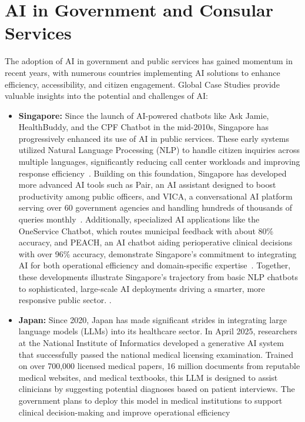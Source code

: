 \documentclass[12pt]{report}
\begin{document}
\section{AI in Government and Consular Services}

The adoption of AI in government and public services has gained momentum in recent years, with numerous countries implementing AI solutions to enhance efficiency, accessibility, and citizen engagement. 
Global Case Studies provide valuable insights into the potential and challenges of AI:
\begin{itemize}
    \item \textbf{Singapore:} Since the launch of AI-powered chatbots like Ask Jamie, HealthBuddy, and the CPF Chatbot in the mid-2010s, Singapore has progressively enhanced its use of AI in public services. These early systems utilized Natural Language Processing (NLP) to handle citizen inquiries across multiple languages, significantly reducing call center workloads and improving response efficiency~\cite{govtech2016askjamie}. Building on this foundation, Singapore has developed more advanced AI tools such as Pair, an AI assistant designed to boost productivity among public officers, and VICA, a conversational AI platform serving over 60 government agencies and handling hundreds of thousands of queries monthly~\cite{govtech2025pair}. Additionally, specialized AI applications like the OneService Chatbot, which routes municipal feedback with about 80\% accuracy, and PEACH, an AI chatbot aiding perioperative clinical decisions with over 96\% accuracy, demonstrate Singapore's commitment to integrating AI for both operational efficiency and domain-specific expertise~\cite{chong2024peach}. Together, these developments illustrate Singapore's trajectory from basic NLP chatbots to sophisticated, large-scale AI deployments driving a smarter, more responsive public sector. \cite{govsgvica2025}.
    \item \textbf{Japan:} Since 2020, Japan has made significant strides in integrating large language models (LLMs) into its healthcare sector. In April 2025, researchers at the National Institute of Informatics developed a generative AI system that successfully passed the national medical licensing examination. Trained on over 700,000 licensed medical papers, 16 million documents from reputable medical websites, and medical textbooks, this LLM is designed to assist clinicians by suggesting potential diagnoses based on patient interviews. The government plans to deploy this model in medical institutions to support clinical decision-making and improve operational efficiency~\cite{nii2025ai,crds2024rwd}

\end{itemize}
\end{document}
